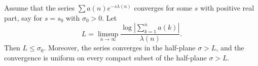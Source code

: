 Assume that the series $\sum a(n)e^{-s\lambda(n)}$ converges for some $s$ with positive real part, say for $s = s_0$ with $\sigma_0 > 0$. Let
$$L = \limsup_{n \to \infty} \frac{\log\left|\sum_{k=1}^n a(k)\right|}{\lambda(n)}.$$
Then $L \leq \sigma_0$. Moreover, the series converges in the half-plane $\sigma > L$, and the convergence is uniform on every compact subset of the half-plane $\sigma > L$.
